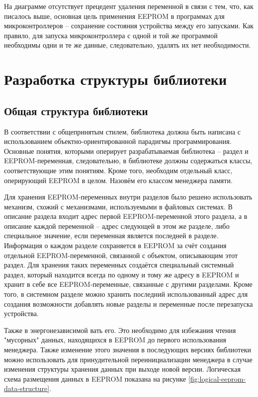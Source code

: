 На диаграмме отсутствует прецедент удаления переменной в связи с тем, что, как писалось выше, основная цель применения EEPROM в программах для  микроконтроллеров -- сохранение состояния устройства между его запусками.
Как правило, для запуска микроконтроллера с одной и той же программой необходимы одни и те же данные, следовательно, удалять их нет необходимости.

\section{Разработка структуры библиотеки}

\subsection{Общая структура библиотеки} \label{subsection:library-structure}

В соответствии с общепринятым стилем, библиотека должна быть написана с использованием объектно-ориентированной парадигмы программирования.
Основные понятия, которыми оперирует разрабатываемая библиотека -- раздел и EEPROM-переменная, следовательно, в библиотеке должны содержаться классы, соответствующие этим понятиям.
Кроме того, необходим отдельный класс, оперирующий EEPROM в целом. Назовём его классом менеджера памяти.

Для хранения EEPROM-переменных внутри разделов было решено использовать механизм, схожий с механизмами, используемыми в файловых системах.
В описание раздела входит адрес первой EEPROM-переменной этого раздела, а в описание каждой переменной -- адрес следующей в этом же разделе, либо специальное значение, если переменная является последней в разделе.
Информация о каждом разделе сохраняется в EEPROM за счёт создания отдельной EEPROM-переменной, связанной с объектом, описывающим этот раздел.
Для хранения таких переменных создаётся специальный системный раздел, который находится всегда по одному и тому же адресу в EEPROM и хранит в себе все EEPROM-переменные, связанные с другими разделами.
Кроме того, в системном разделе можно хранить последний использованный адрес для создания возможности добавлять новые разделы и переменные после перезапуска устройства.

Также в энергонезависимой  вать его.
Это необходимо для избежания чтения "мусорных" данных, находящихся в EEPROM до первого использования менеджера.
Также изменение этого значения в последующих версиях библиотеки можно использовать для принудительной переинициализации менеджера в случае изменения структуры хранения данных при выходе новой версии.
Логическая схема размещения данных в EEPROM показана на рисунке \ref{fig:logical-eeprom-data-structure}.

